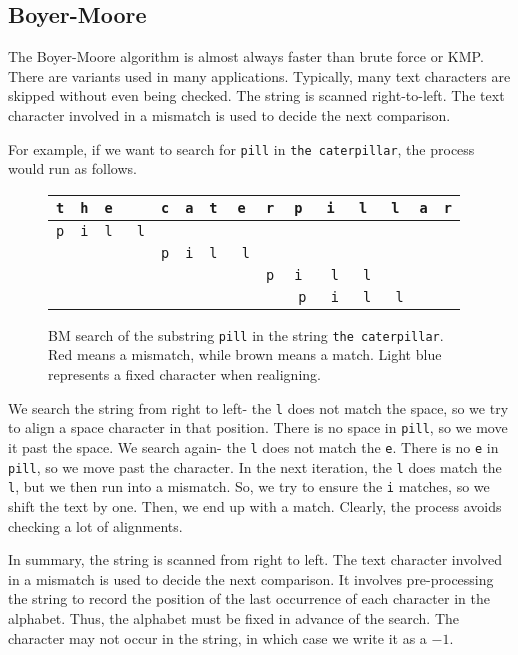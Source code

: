 \documentclass[a4paper, openany]{memoir}
\begin{document}
\subsection{Boyer-Moore}
The Boyer-Moore algorithm is almost always faster than brute force or KMP. There are variants used in many applications. Typically, many text characters are skipped without even being checked. The string is scanned right-to-left. The text character involved in a mismatch is used to decide the next comparison.

For example, if we want to search for \texttt{pill} in \texttt{the caterpillar}, the process would run as follows.
\begin{figure}[H]
    \centering
    \begin{tabular}{ccccccccccccccc}
        \texttt{t} & \texttt{h} & \texttt{e} & & \texttt{c} & \texttt{a} & \texttt{t} & \texttt{e} & \texttt{r} & \texttt{p} & \texttt{i} & \texttt{l} & \texttt{l} & \texttt{a} & \texttt{r} \\
        \hline
        \texttt{p} & \texttt{i} & \texttt{l} & \texttt{\color{red} l} \\
        & & & & \texttt{p} & \texttt{i} & \texttt{l} & \texttt{\color{red} l} \\
        & & & & & & & & \texttt{p} & \texttt{i} & \texttt{\color{red} l} & \texttt{\color{brown} l} \\
        & & & & & & & & & \texttt{\color{brown} p} & \texttt{\color{cyan} i} & \texttt{\color{brown} l} & \texttt{\color{brown} l}
    \end{tabular}
    \caption{BM search of the substring \texttt{pill} in the string \texttt{the caterpillar}. Red means a mismatch, while brown means a match. Light blue represents a fixed character when realigning.}
\end{figure}
\noindent We search the string from right to left- the \texttt{l} does not match the space, so we try to align a space character in that position. There is no space in \texttt{pill}, so we move it past the space. We search again- the \texttt{l} does not match the \texttt{e}. There is no \texttt{e} in \texttt{pill}, so we move past the character. In the next iteration, the \texttt{l} does match the \texttt{l}, but we then run into a mismatch. So, we try to ensure the \texttt{i} matches, so we shift the text by one. Then, we end up with a match. Clearly, the process avoids checking a lot of alignments.

In summary, the string is scanned from right to left. The text character involved in a mismatch is used to decide the next comparison. It involves pre-processing the string to record the position of the last occurrence of each character in the alphabet. Thus, the alphabet must be fixed in advance of the search. The character may not occur in the string, in which case we write it as a $-1$. 
\end{document}
